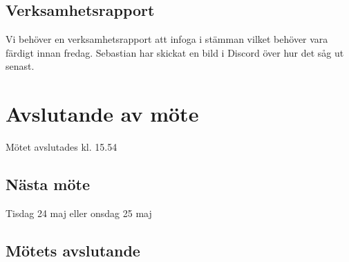 \documentclass[protokoll]{dvd}
\begin{document}
\subsection{Verksamhetsrapport}
Vi behöver en verksamhetsrapport att infoga i stämman vilket behöver vara färdigt innan fredag.
Sebastian har skickat en bild i Discord över hur det såg ut senast.

\section{Avslutande av möte}
Mötet avslutades kl. 15.54


\subsection{Nästa möte}
Tisdag 24 maj eller onsdag 25 maj

\subsection{Mötets avslutande}

\styrelsesignaturer
\end{document}
